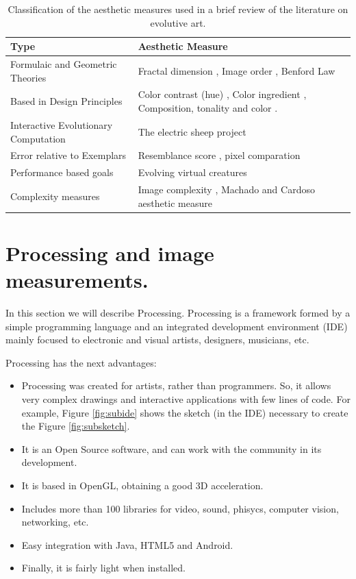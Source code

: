 \documentclass[conference]{IEEEtran}
\begin{document}
\begin{table}[!t] 
\renewcommand{\arraystretch}{1.3} 
\caption{Classification of the aesthetic measures used in a brief review of the literature on evolutive art.} 
\label{table_class} 
\centering
\begin{tabular}{|l|l|}
\hline
Type & Aesthetic Measure \\ \hline
Formulaic and Geometric Theories & Fractal dimension \cite{den2010comparing}, Image order \cite{li2012investigating}, Benford Law \cite{del2005benford}\\ \hline
Based in Design Principles &  Color contrast (hue) \cite{den2012evolving},  Color ingredient \cite{li2012investigating}, Composition, tonality and color \cite{dipaola2009incorporating}.\\ \hline
Interactive Evolutionary Computation & The electric sheep project \cite{draves2006electric} \\ \hline
Error relative to Exemplars &  Resemblance score \cite{dipaola2009incorporating}, pixel comparation \cite{aguilar2008robotic}\\ \hline
Performance based goals & Evolving virtual creatures \cite{sims1994evolving} \\\hline
Complexity measures & Image complexity \cite{li2012investigating}, Machado and Cardoso aesthetic measure \cite{machado1998computing}\\ \hline
\end{tabular}
\end{table}

\section{Processing and image measurements.}
\label{sec:processing}
In this section we will describe Processing. Processing \cite{PROCESSING} is a framework formed by a simple programming language and an integrated development environment (IDE) mainly focused to electronic and visual artists, designers, musicians, etc.

Processing has the next advantages:
\begin{itemize}
\item Processing was created for artists, rather than programmers. So, it allows very complex drawings and interactive applications with few lines of code. For example, Figure \ref{fig:subide} shows the sketch (in the IDE) necessary to create the Figure \ref{fig:subsketch}.
\item It is an Open Source software, and can work with the community in its development.
\item It is based in OpenGL, obtaining a good 3D acceleration.
\item Includes more than 100 libraries for video, sound, phisycs, computer vision, networking, etc.
\item Easy integration with Java, HTML5 and Android.
\item Finally, it is fairly light when installed.
\end{itemize}
\end{document}
